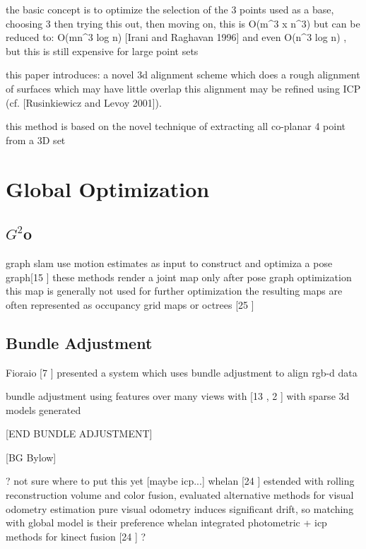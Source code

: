 the basic concept is to optimize the selection of the 3 points used as a base, choosing 3 then trying this out, then moving on,
this is O(m^3 x n^3) but can be reduced to:  O(mn^3 log n) [Irani and Raghavan 1996] and even O(n^3 log n) , but this is still expensive for large point sets

this paper introduces:
a novel 3d alignment scheme which does a rough alignment of surfaces which may have little overlap
this alignment may be refined using ICP  (cf. [Rusinkiewicz and Levoy 2001]). 

this method is based on the novel technique of extracting all co-planar 4 point from a 3D set









\section{Global Optimization}
\subsection{$G^2$o}

graph slam use motion estimates as input to construct and optimiza a pose graph[15 \cite{Kummerle11G}] these methods render a joint map only after pose graph optimization
this map is generally not used for further optimization
the resulting maps are often represented as occupancy grid maps or octrees [25 \cite{Wurm10Octomap}]




\subsection{Bundle Adjustment}

Fioraio [7 \cite{Fioraio11Realtime}] presented a system which uses bundle adjustment to align rgb-d data


bundle adjustment using features over many views with [13 \cite{Klein07Parallel} , 2 \cite{Agarwal09Building}] with sparse 3d models generated

[END BUNDLE ADJUSTMENT]



[BG Bylow]

? not sure where to put this yet [maybe icp...]
whelan [24 \cite{Whelan13Robust}] estended with rolling reconstruction volume and color fusion, evaluated alternative methods for visual odometry estimation
pure visual odometry induces significant drift, so matching with global model is their preference
whelan integrated photometric + icp methods for kinect fusion [24 \cite{Whelan13Robust}]
?






